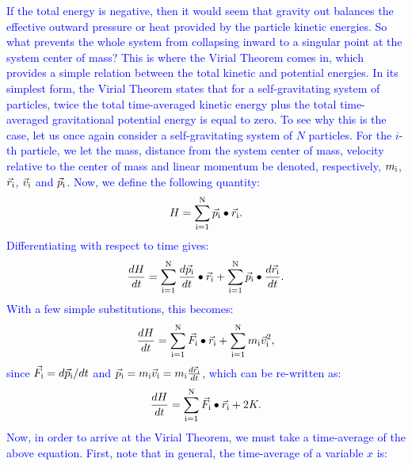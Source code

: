 \documentclass[main.tex]{subfiles}
\begin{document}
\begin{tcolorbox}[sharp corners, colback=blue!30, colframe=blue!80!blue, title=Virial Theorem]
\par \textcolor{blue} {If the total energy is negative, then it would seem that gravity out balances the effective outward pressure or heat provided by the particle kinetic energies.  So what prevents the whole system from collapsing inward to a singular point at the system center of mass?  This is where the Virial Theorem comes in, which provides a simple relation between the total kinetic and potential energies.  In its simplest form, the Virial Theorem states that for a self-gravitating system of particles, twice the total time-averaged kinetic energy plus the total time-averaged gravitational potential energy is equal to zero.  To see why this is the case, let us once again consider a self-gravitating system of $N$ particles.  For the $i$-th particle, we let the mass, distance from the system center of mass, velocity relative to the center of mass and linear momentum be denoted, respectively, $m_{\rm i}$, $\vec{r}_{\rm i}$, $\vec{v}_{\rm i}$ and $\vec{p}_{\rm i}$.   Now, we define the following quantity:
\begin{equation}
H = \sum_{\rm i=1}^{\rm N} \vec{p}_{\rm i} \bullet \vec{r}_{\rm i}.
\end{equation}
Differentiating with respect to time gives:
\begin{equation}
\frac{dH}{dt} =  \sum_{\rm i=1}^{\rm N} \frac{d\vec{p}_{\rm i}}{dt} \bullet \vec{r}_{\rm i} + \sum_{\rm i=1}^{\rm N} \vec{p}_{\rm i} \bullet \frac{d\vec{r}_{\rm i}}{dt}.
\end{equation}
With a few simple substitutions, this becomes:
\begin{equation}
\frac{dH}{dt} =  \sum_{\rm i=1}^{\rm N} \vec{F}_{\rm i} \bullet \vec{r}_{\rm i} + \sum_{\rm i=1}^{\rm N} m_{\rm i}\vec{v}_{\rm i}^2,
\end{equation}
since $\vec{F}_{\rm i} = d\vec{p}_{\rm i}/dt$ and $\vec{p}_{\rm i} = m_{\rm i}\vec{v}_{\rm i} = m_{\rm i}\frac{d\vec{r}_{\rm i}}{dt}$,
which can be re-written as:
\begin{equation}
\frac{dH}{dt} =  \sum_{\rm i=1}^{\rm N} \vec{F}_{\rm i} \bullet \vec{r}_{\rm i} + 2K.
\label{eqn:dhdt}
\end{equation}
Now, in order to arrive at the Virial Theorem, we must take a time-average of the above equation.  First, note that in general, the time-average of a variable $x$ is:
}
\end{tcolorbox}
\end{document}
